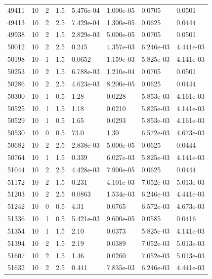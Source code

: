 \documentclass[preview]{standalone}
\begin{document}
{{{{{{{{{\begin{tabular}{L{1.2cm}C{1.2cm} C{0.3cm}C{0.5cm} C{1.4cm}C{1.4cm} C{1.4cm}C{1.4cm}}
  49411  &    10  & 2     & 1.5 &  5.476e-04  & 1.000e-05  & 0.0705 &  0.0501   \\ 
  49413  &    10  & 2     & 2.5 &  7.429e-04  & 1.300e-05  & 0.0625 &  0.0444   \\ 
  49938  &    10  & 2     & 1.5 &  2.829e-03  & 5.000e-05  & 0.0705 &  0.0501   \\ 
  50012  &    10  & 2     & 2.5 &  0.245  & 4.357e-03  & 6.246e-03 &  4.441e-03   \\ 
  50198  &    10  & 1     & 1.5 &  0.0652  & 1.159e-03  & 5.825e-03 &  4.141e-03   \\ 
  50253  &    10  & 2     & 1.5 &  6.788e-03  & 1.210e-04  & 0.0705 &  0.0501   \\ 
  50286  &    10  & 2     & 2.5 &  4.623e-03  & 8.200e-05  & 0.0625 &  0.0444   \\ 
  50300  &    10  & 1     & 0.5 &  1.28  & 0.0228  & 5.853e-03 &  4.161e-03   \\ 
  50525  &    10  & 1     & 1.5 &  1.18  & 0.0210  & 5.825e-03 &  4.141e-03   \\ 
  50529  &    10  & 1     & 0.5 &  1.65  & 0.0293  & 5.853e-03 &  4.161e-03   \\ 
  50530  &    10  & 0     & 0.5 &  73.0  & 1.30  & 6.572e-03 &  4.673e-03   \\ 
  50682  &    10  & 2     & 2.5 &  2.838e-03  & 5.000e-05  & 0.0625 &  0.0444   \\ 
  50764  &    10  & 1     & 1.5 &  0.339  & 6.027e-03  & 5.825e-03 &  4.141e-03   \\ 
  51044  &    10  & 2     & 2.5 &  4.428e-03  & 7.900e-05  & 0.0625 &  0.0444   \\ 
  51172  &    10  & 2     & 1.5 &  0.231  & 4.101e-03  & 7.052e-03 &  5.013e-03   \\ 
  51203  &    10  & 2     & 2.5 &  0.0863  & 1.534e-03  & 6.246e-03 &  4.441e-03   \\ 
  51242  &    10  & 0     & 0.5 &  4.31  & 0.0765  & 6.572e-03 &  4.673e-03   \\ 
  51336  &    10  & 1     & 0.5 &  5.421e-03  & 9.600e-05  & 0.0585 &  0.0416   \\ 
  51354  &    10  & 1     & 1.5 &  2.10  & 0.0373  & 5.825e-03 &  4.141e-03   \\ 
  51394  &    10  & 2     & 1.5 &  2.19  & 0.0389  & 7.052e-03 &  5.013e-03   \\ 
  51607  &    10  & 2     & 1.5 &  1.46  & 0.0260  & 7.052e-03 &  5.013e-03   \\ 
  51632  &    10  & 2     & 2.5 &  0.441  & 7.835e-03  & 6.246e-03 &  4.441e-03   \\ 

\end{tabular}}}}}}}}}}
\end{document}
